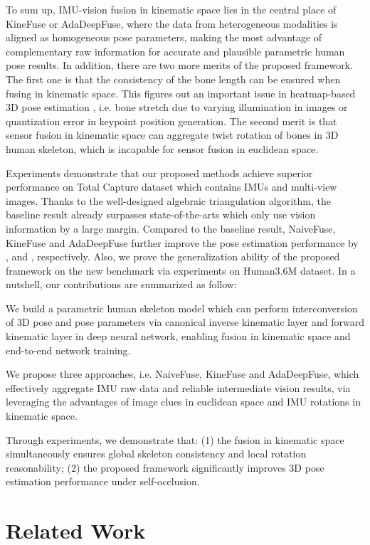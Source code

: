 \documentclass[lettersize,journal]{IEEEtran}
\begin{document}
To sum up, IMU-vision fusion in kinematic space lies in the central place of KineFuse or AdaDeepFuse, where the data from heterogeneous modalities is aligned as homogeneous pose parameters, making the most advantage of complementary raw information for accurate and plausible parametric human pose results. In addition, there are two more merits of the proposed framework. The first one is that the consistency of the bone length can be ensured when fusing in kinematic space. This figures out an important issue in heatmap-based 3D pose estimation \cite{kamel2020hybrid,li2021tokenpose}, i.e. bone stretch due to varying illumination in images or quantization error in keypoint position generation. The second merit is that sensor fusion in kinematic space can aggregate twist rotation of bones in 3D human skeleton, which is incapable for sensor fusion in euclidean space.

Experiments demonstrate that our proposed methods achieve superior performance on Total Capture dataset which contains IMUs and multi-view images. Thanks to the well-designed algebraic triangulation algorithm, the baseline result already surpasses state-of-the-arts which only use vision information by a large margin. Compared to the baseline result, NaiveFuse, KineFuse and AdaDeepFuse further improve the pose estimation performance by ,  and , 
respectively. Also, we prove the generalization ability of the proposed framework on the new benchmark via experiments on Human3.6M dataset. In a nutshell, our contributions are summarized as follow:

\indent  We build a parametric human skeleton model which can perform interconversion of 3D pose and pose parameters via canonical inverse kinematic layer and forward kinematic layer in deep neural network, enabling fusion in kinematic space and end-to-end network training.

\indent  We propose three approaches, i.e. NaiveFuse, KineFuse and AdaDeepFuse, which effectively aggregate IMU raw data and reliable intermediate vision results, via leveraging the advantages of image clues in euclidean space and IMU rotations in kinematic space.

\indent  Through experiments, we demonstrate that: (1) the fusion in kinematic space simultaneously ensures global skeleton consistency and local rotation reasonability; (2) the proposed framework significantly improves 3D pose estimation performance under self-occlusion.

\section{Related Work}
 
\end{document}
